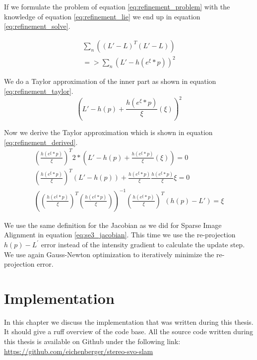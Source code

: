 \documentclass[11pt,a4paper,titlepage,oneside]{report}
\begin{document}
If we formulate the problem of equation \ref{eq:refinement_problem} with the knowledge of equation \ref{eq:refinement_lie} we end up in equation \ref{eq:refinement_solve}.

\begin{equation}\label{eq:refinement_solve}
  \begin{gathered}
    \sum_n ((L'-L)^T(L'-L))\\
    =>\sum_n (L'-h(e^{\xi}*p))^2
  \end{gathered}
\end{equation}

We do a Taylor approximation of the inner part as shown in equation \ref{eq:refinement_taylor}.
\begin{equation}\label{eq:refinement_taylor}
  (L'-h(p)+\frac{h(e^{\xi}*p)}{\xi}(\xi))^2
\end{equation}

Now we derive the Taylor approximation which is shown in equation \ref{eq:refinement_derived}.
\begin{equation}\label{eq:refinement_derived}
  \begin{gathered}
    (\frac{h(e^{\xi}*p)}{\xi})^T2*(L'-h(p)+\frac{h(e^{\xi}*p)}{\xi}(\xi))=0\\
    (\frac{h(e^{\xi}*p)}{\xi})^T(L'-h(p))+\frac{h(e^{\xi}*p)}{\xi}\frac{h(e^{\xi}*p)}{\xi}\xi=0\\
		((\frac{h(e^{\xi}*p)}{\xi})^T(\frac{h(e^{\xi}*p)}{\xi}))^{-1}(\frac{h(e^{\xi}*p)}{\xi})^T(h(p)-L')=\xi
  \end{gathered}
\end{equation}

We use the same definition for the Jacobian as we did for Sparse Image Alignment in equation \ref{eq:se3_jacobian}. This time we use the re-projection $h(p)-L^{'}$ error instead of the intensity gradient to calculate the update step. We use again Gauss-Newton optimization to iteratively minimize the re-projection error.

\chapter{Implementation}\label{ch:implementation}
In this chapter we discuss the implementation that was written during this thesis. It should give a ruff overview of the code base. All the source code written during this thesis is available on Github under the following link:\\
\url{https://github.com/eichenberger/stereo-svo-slam}
\end{document}
